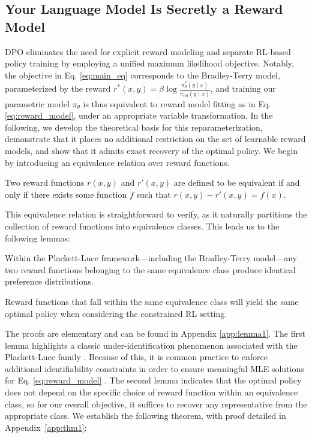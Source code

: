 \label{sec:theory}

\subsection{Your Language Model Is Secretly a Reward Model} DPO eliminates the need for explicit reward modeling and separate RL-based policy training by employing a unified maximum likelihood objective. Notably, the objective in Eq. \ref{eq:main_eq} corresponds to the Bradley-Terry model, parameterized by the reward $r^*(x, y) = \beta \log\frac{\pi^*_\theta(y \mid x)}{\pi_\text{ref}(y \mid x)}$, and training our parametric model $\pi_{\theta}$ is thus equivalent to reward model fitting as in Eq. \ref{eq:reward_model}, under an appropriate variable transformation. In the following, we develop the theoretical basis for this reparameterization, demonstrate that it places no additional restriction on the set of learnable reward models, and show that it admits exact recovery of the optimal policy. We begin by introducing an equivalence relation over reward functions.

\begin{definition}
Two reward functions $r(x, y)$ and $r'(x, y)$ are defined to be equivalent if and only if there exists some function $f$ such that ${r(x, y)-r'(x, y) = f(x)}$.
\end{definition}

This equivalence relation is straightforward to verify, as it naturally partitions the collection of reward functions into equivalence classes. This leads us to the following lemmas:

\begin{lemma}\label{lemma:same_prefrence}
Within the Plackett-Luce framework—including the Bradley-Terry model—any two reward functions belonging to the same equivalence class produce identical preference distributions.
\end{lemma}

\begin{lemma}\label{lemma:same_policy}
Reward functions that fall within the same equivalence class will yield the same optimal policy when considering the constrained RL setting.
\end{lemma}

The proofs are elementary and can be found in Appendix \ref{app:lemma1}. The first lemma highlights a classic under-identification phenomenon associated with the Plackett-Luce family \cite{plackett1975analysis}. Because of this, it is common practice to enforce additional identifiability constraints in order to ensure meaningful MLE solutions for Eq. \ref{eq:reward_model} \cite{bong2022generalized}. The second lemma indicates that the optimal policy does not depend on the specific choice of reward function within an equivalence class, so for our overall objective, it suffices to recover any representative from the appropriate class. We establish the following theorem, with proof detailed in Appendix~\ref{app:thm1}:

